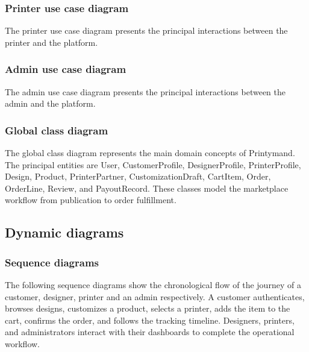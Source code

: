 \subsubsection{Printer use case diagram}
The printer use case diagram presents the principal interactions between the printer and the platform.
\pagebreak
\subsubsection{Admin use case diagram}
The admin use case diagram presents the principal interactions between the admin and the platform.

\pagebreak
\subsubsection{Global class diagram}
The global class diagram represents the main domain concepts of Printymand.
The principal entities are User, CustomerProfile, DesignerProfile, PrinterProfile, Design, Product, PrinterPartner, CustomizationDraft, CartItem, Order, OrderLine, Review, and PayoutRecord.
These classes model the marketplace workflow from publication to order fulfillment.


\subsection{Dynamic diagrams}
\subsubsection{Sequence diagrams}
The following sequence diagrams show the chronological flow of the journey of a customer, designer, printer and an admin respectively.
A customer authenticates, browses designs, customizes a product, selects a printer, adds the item to the cart, confirms the order, and follows the tracking timeline.
Designers, printers, and administrators interact with their dashboards to complete the operational workflow.
\pagebreak
{}
\pagebreak
{}
\pagebreak
{}
\pagebreak
